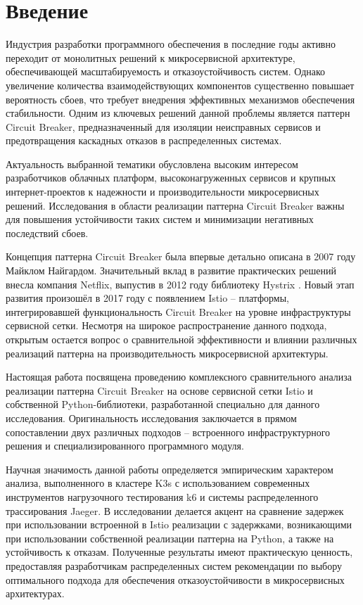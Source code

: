 \chapter*{Введение}
\label{sec:afterwords}


Индустрия разработки программного обеспечения в последние годы активно переходит от монолитных решений к микросервисной архитектуре, обеспечивающей масштабируемость и отказоустойчивость систем. Однако увеличение количества взаимодействующих компонентов существенно повышает вероятность сбоев, что требует внедрения эффективных механизмов обеспечения стабильности. Одним из ключевых решений данной проблемы является паттерн Circuit Breaker, предназначенный для изоляции неисправных сервисов и предотвращения каскадных отказов в распределенных системах.

Актуальность выбранной тематики обусловлена высоким интересом разработчиков облачных платформ, высоконагруженных сервисов и крупных интернет-проектов к надежности и производительности микросервисных решений. Исследования в области реализации паттерна Circuit Breaker важны для повышения устойчивости таких систем и минимизации негативных последствий сбоев.

Концепция паттерна Circuit Breaker была впервые детально описана в 2007 году Майклом Найгардом\cite{Nygard1stEdition}. Значительный вклад в развитие практических решений внесла компания Netflix, выпустив в 2012 году библиотеку Hystrix \cite{hystrix_wiki}. Новый этап развития произошёл в 2017 году с появлением Istio\cite{istio_gluecon2017} – платформы, интегрировавшей функциональность Circuit Breaker на уровне инфраструктуры сервисной сетки. Несмотря на широкое распространение данного подхода, открытым остается вопрос о сравнительной эффективности и влиянии различных реализаций паттерна на производительность микросервисной архитектуры.

Настоящая работа посвящена проведению комплексного сравнительного анализа реализации паттерна Circuit Breaker на основе сервисной сетки Istio и собственной Python-библиотеки, разработанной специально для данного исследования. Оригинальность исследования заключается в прямом сопоставлении двух различных подходов – встроенного инфраструктурного решения и специализированного программного модуля.

Научная значимость данной работы определяется эмпирическим характером анализа, выполненного в кластере K3s с использованием современных инструментов нагрузочного тестирования k6 и системы распределенного трассирования Jaeger. В исследовании делается акцент на сравнение задержек при использовании встроенной в Istio реализации с задержками, возникающими при использовании собственной реализации паттерна на Python, а также на устойчивость к отказам. Полученные результаты имеют практическую ценность, предоставляя разработчикам распределенных систем рекомендации по выбору оптимального подхода для обеспечения отказоустойчивости в микросервисных архитектурах.



